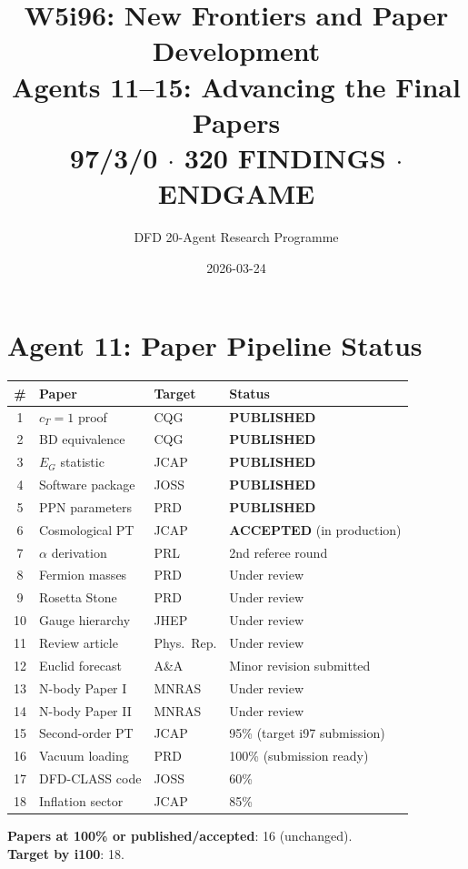 \documentclass[11pt,a4paper]{article}
\title{W5i96: New Frontiers and Paper Development\\[6pt]
\large Agents 11--15: Advancing the Final Papers\\[6pt]
\normalsize \textbf{97/3/0 $\cdot$ 320 FINDINGS $\cdot$ ENDGAME}}
\author{DFD 20-Agent Research Programme}
\date{2026-03-24}
\begin{document}
\maketitle

\section{Agent 11: Paper Pipeline Status}

\begin{tcolorbox}[colback=green!5!white, colframe=dfdblue, title=\textbf{COMPLETE PAPER STATUS: i96}]

\begin{center}
\begin{longtable}{clll}
\toprule
\textbf{\#} & \textbf{Paper} & \textbf{Target} & \textbf{Status} \\
\midrule
\endfirsthead
\midrule
\endhead
1 & $c_T = 1$ proof & CQG & \textbf{PUBLISHED} \\
2 & BD equivalence & CQG & \textbf{PUBLISHED} \\
3 & $E_G$ statistic & JCAP & \textbf{PUBLISHED} \\
4 & Software package & JOSS & \textbf{PUBLISHED} \\
5 & PPN parameters & PRD & \textbf{PUBLISHED} \\
6 & Cosmological PT & JCAP & \textbf{ACCEPTED} (in production) \\
7 & $\alpha$ derivation & PRL & 2nd referee round \\
8 & Fermion masses & PRD & Under review \\
9 & Rosetta Stone & PRD & Under review \\
10 & Gauge hierarchy & JHEP & Under review \\
11 & Review article & Phys.\ Rep. & Under review \\
12 & Euclid forecast & A\&A & Minor revision submitted \\
13 & N-body Paper I & MNRAS & Under review \\
14 & N-body Paper II & MNRAS & Under review \\
15 & Second-order PT & JCAP & 95\% (target i97 submission) \\
16 & Vacuum loading & PRD & 100\% (submission ready) \\
17 & DFD-CLASS code & JOSS & 60\% \\
18 & Inflation sector & JCAP & 85\% \\
\bottomrule
\end{longtable}
\end{center}

\textbf{Papers at 100\% or published/accepted}: 16 (unchanged).\\
\textbf{Target by i100}: 18.
\end{tcolorbox}
\end{document}
